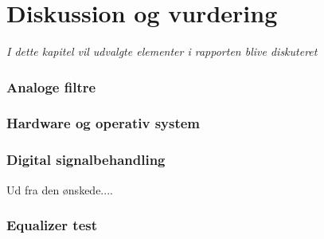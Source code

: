 \chapter{Diskussion og vurdering}\label{kap:diskussion}
\emph{I dette kapitel vil udvalgte elementer i rapporten blive diskuteret}

\subsection{Analoge filtre}

\subsection{Hardware og operativ system}

\subsection{Digital signalbehandling}
Ud fra den ønskede....
\subsection{Equalizer test}
